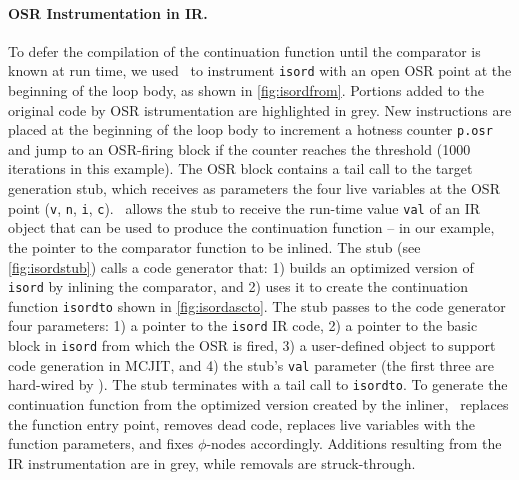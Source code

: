 \paragraph{OSR Instrumentation in IR.}
To defer the compilation of the continuation function until the comparator is known at run time, we used \osrkit\ to instrument {\tt isord} with an open OSR point at the beginning of the loop body, as shown in \myfigure\ref{fig:isordfrom}. Portions added to the original code by OSR istrumentation are highlighted in grey.
New instructions are placed at the beginning of the loop body to increment a hotness counter {\tt p.osr} and jump to an OSR-firing block if the counter reaches the threshold (1000 iterations in this example). The OSR block contains a tail call to the target generation stub, which receives as parameters the four live variables at the OSR point ({\tt v}, {\tt n}, {\tt i}, {\tt c}). \osrkit\ allows the stub to receive the run-time value {\tt val} of an IR object that can be used to produce the continuation function -- in our example, the pointer to the comparator function to be inlined. The stub (see \myfigure\ref{fig:isordstub}) calls a code generator that: 1) builds an optimized version of {\tt isord} by inlining the comparator, and 2) uses it to create the continuation function {\tt isordto} shown in \myfigure\ref{fig:isordascto}. The stub passes to the code generator four parameters: 1) a pointer to the {\tt isord} IR code, 2) a pointer to the basic block in {\tt isord} from which the OSR is fired, 3) a user-defined object to support code generation in MCJIT, and 4) the stub's {\tt val} parameter (the first three are hard-wired by \osrkit). The stub terminates with a tail call to {\tt isordto}. To generate the continuation function from the optimized version created by the inliner, \osrkit\ replaces the function entry point, removes dead code, replaces live variables with the function parameters, and fixes $\phi$-nodes accordingly. Additions resulting from the IR instrumentation are in grey, while removals are struck-through.

